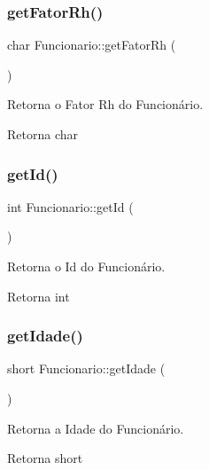 \subsubsection{\texorpdfstring{get\+Fator\+Rh()}{getFatorRh()}}
{\footnotesize\ttfamily char Funcionario\+::get\+Fator\+Rh (\begin{DoxyParamCaption}{ }\end{DoxyParamCaption})}



Retorna o Fator Rh do Funcionário. 

\begin{DoxyReturn}{Retorna}
char 
\end{DoxyReturn}
\mbox{\label{classFuncionario_a0288286a907e587b7ab75d6c23354a06}} 
\subsubsection{\texorpdfstring{get\+Id()}{getId()}}
{\footnotesize\ttfamily int Funcionario\+::get\+Id (\begin{DoxyParamCaption}{ }\end{DoxyParamCaption})}



Retorna o Id do Funcionário. 

\begin{DoxyReturn}{Retorna}
int 
\end{DoxyReturn}
\mbox{\label{classFuncionario_ac8b1947b4cb1c1216291c4750670fba2}} 
\subsubsection{\texorpdfstring{get\+Idade()}{getIdade()}}
{\footnotesize\ttfamily short Funcionario\+::get\+Idade (\begin{DoxyParamCaption}{ }\end{DoxyParamCaption})}



Retorna a Idade do Funcionário. 

\begin{DoxyReturn}{Retorna}
short 
\end{DoxyReturn}
\mbox{\label{classFuncionario_a35376709ae5c7357e79ca612a74e7f15}} 
